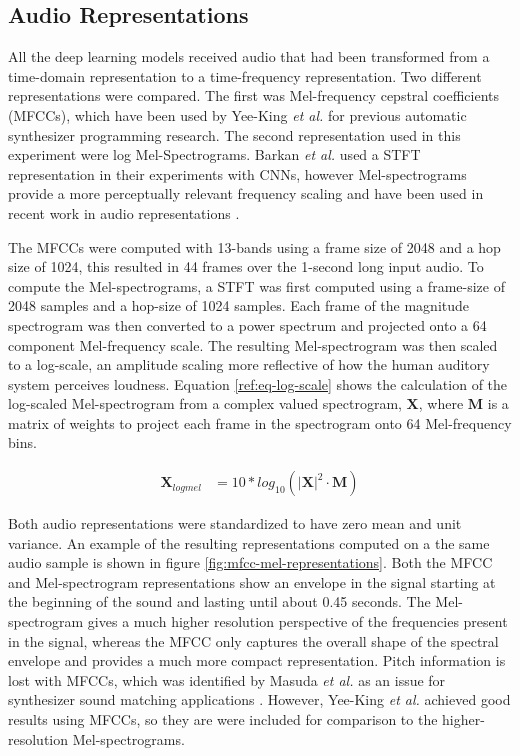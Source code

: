 \subsection{Audio Representations}
All the deep learning models received audio that had been transformed from a time-domain representation to a time-frequency representation. Two different representations were compared. The first was Mel-frequency cepstral coefficients (MFCCs), which have been used by Yee-King \textit{et al.} \cite{yee2011automatic, yee2018automatic} for previous automatic synthesizer programming research. The second representation used in this experiment were log Mel-Spectrograms. Barkan \textit{et al.} \cite{barkan2019inversynth} used a STFT representation in their experiments with CNNs, however Mel-spectrograms provide a more perceptually relevant frequency scaling and have been used in recent work in audio representations \cite{cramer:learnmore:icassp:19, hershey2017cnn}. 

The MFCCs were computed with 13-bands using a frame size of 2048 and a hop size of 1024, this resulted in 44 frames over the 1-second long input audio. To compute the Mel-spectrograms, a STFT was first computed using a frame-size of 2048 samples and a hop-size of 1024 samples. Each frame of the magnitude spectrogram was then converted to a power spectrum and projected onto a 64 component Mel-frequency scale. The resulting Mel-spectrogram was then scaled to a log-scale, an amplitude scaling more reflective of how the human auditory system perceives loudness. Equation \ref{ref:eq-log-scale} shows the calculation of the log-scaled Mel-spectrogram from a complex valued spectrogram, $\textbf{X}$, where $\textbf{M}$ is a matrix of weights to project each frame in the spectrogram onto 64 Mel-frequency bins.

\begin{align}\label{ref:eq-log-scale}
    \textbf{X}_{logmel} &= 10*log_{10}(|\textbf{X}|^2 \cdot \textbf{M})
\end{align}

Both audio representations were standardized to have zero mean and unit variance. An example of the resulting representations computed on a the same audio sample is shown in figure \ref{fig:mfcc-mel-representations}. Both the MFCC and Mel-spectrogram representations show an envelope in the signal starting at the beginning of the sound and lasting until about 0.45 seconds. The Mel-spectrogram gives a much higher resolution perspective of the frequencies present in the signal, whereas the MFCC only captures the overall shape of the spectral envelope and provides a much more compact representation. Pitch information is lost with MFCCs, which was identified by Masuda \textit{et al.} as an issue for synthesizer sound matching applications \cite{masudo2021quality}. However, Yee-King \textit{et al.} achieved good results using MFCCs, so they are were included for comparison to the higher-resolution Mel-spectrograms.

